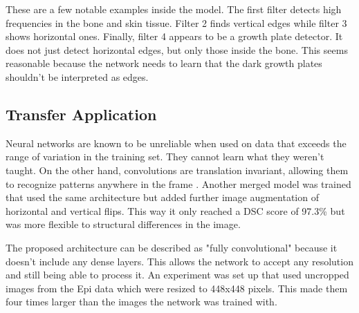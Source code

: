 These are a few notable examples inside the model. The first filter detects high frequencies in the bone and skin tissue. Filter 2 finds vertical edges while filter 3 shows horizontal ones. Finally, filter 4 appears to be a growth plate detector. It does not just detect horizontal edges, but only those inside the bone. This seems reasonable because the network needs to learn that the dark growth plates shouldn't be interpreted as edges.


\subsection{Transfer Application}

Neural networks are known to be unreliable when used on data that exceeds the range of variation in the training set. They cannot learn what they weren't taught. On the other hand, convolutions are translation invariant, allowing them to recognize patterns anywhere in the frame \cite{Chollet2017}. Another merged model was trained that used the same architecture but added further image augmentation of horizontal and vertical flips. This way it only reached a DSC score of 97.3\% but was more flexible to structural differences in the image.

The proposed architecture can be described as "fully convolutional" because it doesn't include any dense layers. This allows the network to accept any resolution and still being able to process it. An experiment was set up that used uncropped images from the Epi data which were resized to 448x448 pixels. This made them four times larger than the images the network was trained with.

